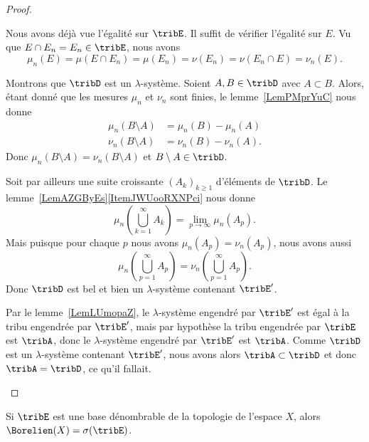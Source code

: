 \begin{proof}
\begin{subproof}
		\spitem[\( \mu_n=\nu_n\) sur \( \tribE'\)]
		Nous avons déjà vue l'égalité sur \( \tribE\). Il suffit de vérifier l'égalité sur \( E\). Vu que \( E\cap E_n=E_n\in\tribE\), nous avons
		\begin{equation}
			\mu_n(E)=\mu(E\cap E_n)=\mu(E_n)=\nu(E_n)=\nu(E_n\cap E)=\nu_n(E).
		\end{equation}

		Montrons que \( \tribD\) est un \( \lambda\)-système. Soient \( A,B\in\tribD\) avec \( A\subset B\). Alors, étant donné que les mesures \( \mu_n\) et \( \nu_n\) sont finies, le lemme~\ref{LemPMprYuC} nous donne
		\begin{subequations}
			\begin{align}
				\mu_n(B\setminus A) & =\mu_n(B)-\mu_n(A)  \\
				\nu_n(B\setminus A) & =\nu_n(B)-\nu_n(A).
			\end{align}
		\end{subequations}
		Donc \( \mu_n(B\setminus A)=\nu_n(B\setminus A)\) et \( B\setminus A\in\tribD\).

		Soit par ailleurs une suite croissante \( (A_k)_{k\geq 1}\) d'éléments de \( \tribD\). Le lemme~\ref{LemAZGByEs}\ref{ItemJWUooRXNPci} nous donne
		\begin{equation}
			\mu_n(\bigcup_{k=1}^{\infty}A_k)=\lim_{p\to \infty} \mu_n(A_p).
		\end{equation}
		Mais puisque pour chaque \( p\) nous avons \( \mu_n(A_p)=\nu_n(A_p)\), nous avons aussi
		\begin{equation}
			\mu_n(\bigcup_{p=1}^{\infty}A_p)=\nu_n(\bigcup_{p=1}^{\infty}A_p).
		\end{equation}
		Donc \( \tribD\) est bel et bien un \( \lambda\)-système contenant \( \tribE'\).

		\spitem[Conclusion]
		Par le lemme~\ref{LemLUmopaZ}, le \( \lambda\)-système engendré par \( \tribE'\) est égal à la tribu engendrée par \( \tribE'\), mais par hypothèse la tribu engendrée par \( \tribE\) est \( \tribA\), donc le \( \lambda\)-système engendré par \( \tribE'\) est \( \tribA\). Comme \( \tribD\) est un \( \lambda\)-système contenant \( \tribE'\), nous avons alors \( \tribA\subset\tribD\) et donc \( \tribA=\tribD\), ce qu'il fallait.
	\end{subproof}
\end{proof}

\begin{proposition}	\label{PROPooAMTTooDfFqcP}
	Si \( \tribE\) est une base dénombrable de la topologie de l'espace \( X\), alors \( \Borelien(X)=\sigma(\tribE)\).
\end{proposition}


